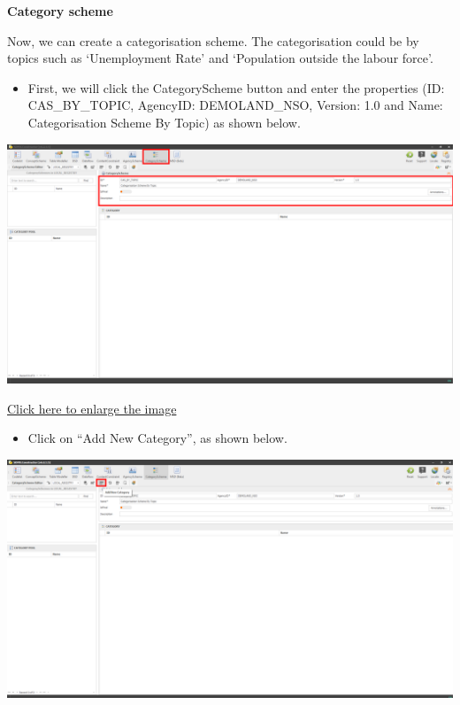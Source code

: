 \documentclass[
]{book}
\providecommand{\tightlist}{%
  \setlength{\itemsep}{0pt}\setlength{\parskip}{0pt}}
\begin{document}
\textbf{Category scheme}

Now, we can create a categorisation scheme. The categorisation could be by topics such as `Unemployment Rate' and `Population outside the labour force'.

\begin{itemize}
\tightlist
\item
  First, we will click the CategoryScheme button and enter the properties (ID: CAS\_BY\_TOPIC, AgencyID: DEMOLAND\_NSO, Version: 1.0 and Name: Categorisation Scheme By Topic) as shown below.
\end{itemize}

\begin{center}\includegraphics[width=1\linewidth]{./images/image160} \end{center}

\href{images/image160.png}{Click here to enlarge the image}

\begin{itemize}
\tightlist
\item
  Click on ``Add New Category'', as shown below.
\end{itemize}

\begin{center}\includegraphics[width=1\linewidth]{./images/image162} \end{center}
\end{document}
